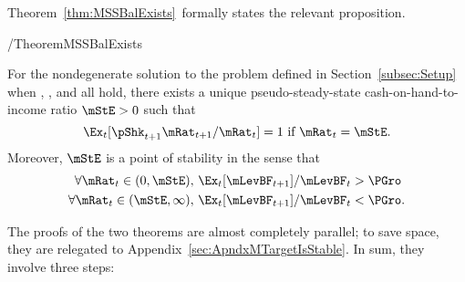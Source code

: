 \documentclass[BufferStockTheory]{subfiles}
\begin{document}

Theorem~\ref{thm:MSSBalExists}~formally states the relevant proposition.
  \begin{verbatimwrite}{\EqDir/TheoremMSSBalExists}
\begin{theorem}\label{thm:MSSBalExists}
 For the nondegenerate solution to the problem defined in Section~\ref{subsec:Setup} when {\FVAC}, {\WRIC}, and {\GIC} all hold, there exists a unique pseudo-steady-state cash-on-hand-to-income ratio $\mStE>0$ such that
  \begin{equation}
    \Ex_t [\pShk_{t+1}{\mRat}_{t+1}/\mRat_t] = 1 \mbox{~if~} \mRat_t = \mStE.
    \label{eq:mStE}
  \end{equation}
  Moreover, $\mStE$ is a point of stability in the sense that
  \begin{align}\label{eq:stabilityStE}
    \forall {\mRat}_t\in(0,\mStE),      \,\,& \Ex_{t}[\mLevBF_{t+1}]/\mLevBF_{t} > \PGro \\
    \forall {\mRat}_t\in(\mStE,\infty), \,\,& \Ex_{t}[\mLevBF_{t+1}]/\mLevBF_{t} < \PGro. \notag
  \end{align}
\end{theorem}
\end{verbatimwrite}



The proofs of the two theorems are almost completely parallel; to save space, they are relegated to Appendix~\ref{sec:ApndxMTargetIsStable}.  In sum, they involve three steps:
\end{document}
